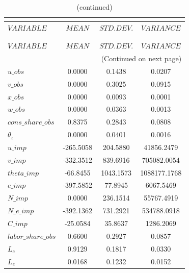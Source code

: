  
\begin{center}
\begin{longtable}{lccc} 
\caption{THEORETICAL MOMENTS}\\
 \label{Table:th_moments}\\
\toprule 
$VARIABLE           $	 & 	 $            MEAN$	 & 	 $       STD. DEV.$	 & 	 $        VARIANCE$\\
\midrule \endfirsthead 
\caption{(continued)}\\
 \toprule \\ 
$VARIABLE           $	 & 	 $            MEAN$	 & 	 $       STD. DEV.$	 & 	 $        VARIANCE$\\
\midrule \endhead 
\midrule \multicolumn{4}{r}{(Continued on next page)} \\ \bottomrule \endfoot 
\bottomrule \endlastfoot 
$u\_obs             $	 & 	          0.0000	 & 	          0.1438	 & 	          0.0207 \\ 
$v\_obs             $	 & 	          0.0000	 & 	          0.3025	 & 	          0.0915 \\ 
$x\_obs             $	 & 	          0.0000	 & 	          0.0093	 & 	          0.0001 \\ 
$w\_obs             $	 & 	          0.0000	 & 	          0.0363	 & 	          0.0013 \\ 
$cons\_share\_obs   $	 & 	          0.8375	 & 	          0.2843	 & 	          0.0808 \\ 
${\theta_z}         $	 & 	          0.0000	 & 	          0.0401	 & 	          0.0016 \\ 
$u\_imp             $	 & 	       -265.5058	 & 	        204.5880	 & 	      41856.2479 \\ 
$v\_imp             $	 & 	       -332.3512	 & 	        839.6916	 & 	     705082.0054 \\ 
$theta\_imp         $	 & 	        -66.8455	 & 	       1043.1573	 & 	    1088177.1768 \\ 
$e\_imp             $	 & 	       -397.5852	 & 	         77.8945	 & 	       6067.5469 \\ 
$N\_imp             $	 & 	          0.0000	 & 	        236.1514	 & 	      55767.4919 \\ 
$N\_e\_imp          $	 & 	       -392.1362	 & 	        731.2921	 & 	     534788.0918 \\ 
$C\_imp             $	 & 	        -25.0584	 & 	         35.8637	 & 	       1286.2069 \\ 
$labor\_share\_obs  $	 & 	          0.6600	 & 	          0.2927	 & 	          0.0857 \\ 
${L_c}              $	 & 	          0.9129	 & 	          0.1817	 & 	          0.0330 \\ 
${L_e}              $	 & 	          0.0168	 & 	          0.1232	 & 	          0.0152 \\ 
\end{longtable}
 \end{center}
